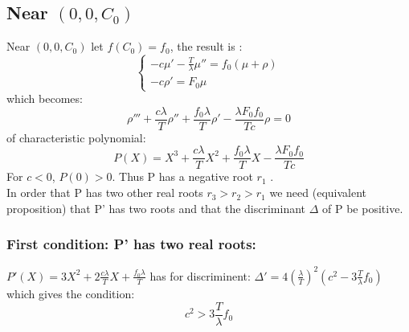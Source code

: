 \documentclass[17pt]{extarticle}
\newcommand{\Tl}{\frac{T}{\lambda}}
\begin{document}
\subsection{Near $(0,0,C_0)$}
Near $(0,0,C_0)$ let $f(C_0)=f_0$, the result is :
\begin{equation} \left\{ \begin{array}{ll} -c \mu'-\Tl\mu''=f_0(\mu+\rho) \\ -c\rho' = F_0\mu   \end{array}\right.
\end{equation} which becomes:  \begin{equation} \rho''' +\frac{c\lambda}{T}\rho''+\frac{f_0\lambda}{T}\rho'-\frac{\lambda F_0f_0}{Tc}\rho =0 \end{equation} of characteristic polynomial: \begin{equation} P(X)= X^3 +\frac{c\lambda}{T}X^2+\frac{f_0\lambda}{T}X-\frac{\lambda F_0f_0}{Tc} \end{equation}
For $c<0$,   $P(0)>0$. Thus P has a negative root $r_1$ .\\
In order that P has two other real roots $r_3>r_2>r_1$ we need (equivalent proposition) that P' has two roots and that the  discriminant $\Delta$ of P be positive.
\subsubsection{First condition: P' has two real roots:}
$P'(X)= 3X^2+ 2\frac{c\lambda}{T}X+ \frac{f_0\lambda}{T}$ has for discriminent: $\Delta'=4(\frac{\lambda}{T})^2(c^2-3 \Tl f_0)$ which gives the condition: \begin{equation} \label{eq:condition_P'}
	\boxed{c^2 >3\Tl f_0
	}
\end{equation}
\end{document}

